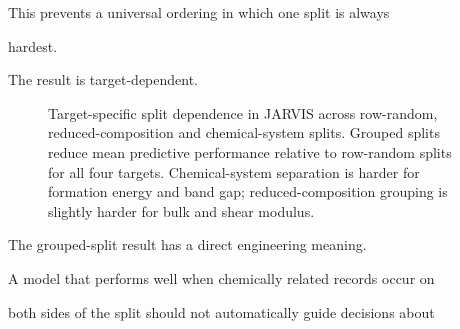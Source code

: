 \documentclass[11pt,a4paper,oneside]{report}
\begin{document}
This prevents a universal ordering in which one split is always

hardest.



The result is target-dependent.





\begin{figure}[H]



\centering






\caption{Target-specific split dependence in JARVIS across row-random, reduced-composition and chemical-system splits. Grouped splits reduce mean predictive performance relative to row-random splits for all four targets. Chemical-system separation is harder for formation energy and band gap; reduced-composition grouping is slightly harder for bulk and shear modulus.}



\label{fig:jarvis-splits}
\end{figure}

The grouped-split result has a direct engineering meaning.



A model that performs well when chemically related records occur on

both sides of the split should not automatically guide decisions about
\end{document}
